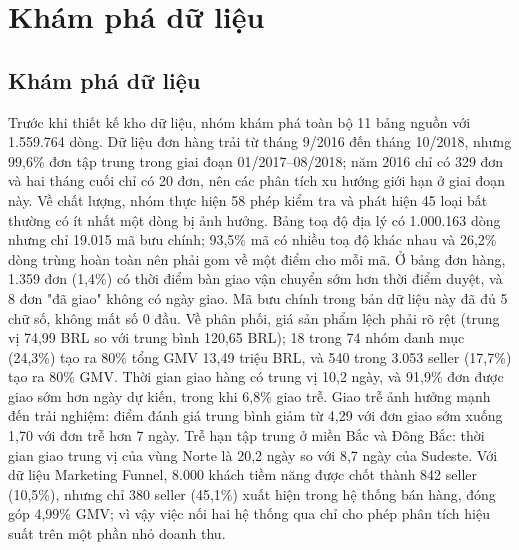 \section{Khám phá dữ liệu}\label{sec:kham-pha}

\subsection{Khám phá dữ liệu}
Trước khi thiết kế kho dữ liệu, nhóm khám phá toàn bộ 11 bảng nguồn với 1.559.764 dòng. Dữ liệu đơn hàng trải từ tháng 9/2016 đến tháng 10/2018, nhưng 99,6\% đơn tập trung trong giai đoạn 01/2017–08/2018; năm 2016 chỉ có 329 đơn và hai tháng cuối chỉ có 20 đơn, nên các phân tích xu hướng giới hạn ở giai đoạn này. Về chất lượng, nhóm thực hiện 58 phép kiểm tra và phát hiện 45 loại bất thường có ít nhất một dòng bị ảnh hưởng. Bảng toạ độ địa lý có 1.000.163 dòng nhưng chỉ 19.015 mã bưu chính; 93,5\% mã có nhiều toạ độ khác nhau và 26,2\% dòng trùng hoàn toàn nên phải gom về một điểm cho mỗi mã. Ở bảng đơn hàng, 1.359 đơn (1,4\%) có thời điểm bàn giao vận chuyển sớm hơn thời điểm duyệt, và 8 đơn "đã giao" không có ngày giao. Mã bưu chính trong bản dữ liệu này đã đủ 5 chữ số, không mất số 0 đầu. Về phân phối, giá sản phẩm lệch phải rõ rệt (trung vị 74,99 BRL so với trung bình 120,65 BRL); 18 trong 74 nhóm danh mục (24,3\%) tạo ra 80\% tổng GMV 13,49 triệu BRL, và 540 trong 3.053 seller (17,7\%) tạo ra 80\% GMV. Thời gian giao hàng có trung vị 10,2 ngày, và 91,9\% đơn được giao sớm hơn ngày dự kiến, trong khi 6,8\% giao trễ. Giao trễ ảnh hưởng mạnh đến trải nghiệm: điểm đánh giá trung bình giảm từ 4,29 với đơn giao sớm xuống 1,70 với đơn trễ hơn 7 ngày. Trễ hạn tập trung ở miền Bắc và Đông Bắc: thời gian giao trung vị của vùng Norte là 20,2 ngày so với 8,7 ngày của Sudeste. Với dữ liệu Marketing Funnel, 8.000 khách tiềm năng được chốt thành 842 seller (10,5\%), nhưng chỉ 380 seller (45,1\%) xuất hiện trong hệ thống bán hàng, đóng góp 4,99\% GMV; vì vậy việc nối hai hệ thống qua  chỉ cho phép phân tích hiệu suất trên một phần nhỏ doanh thu.

